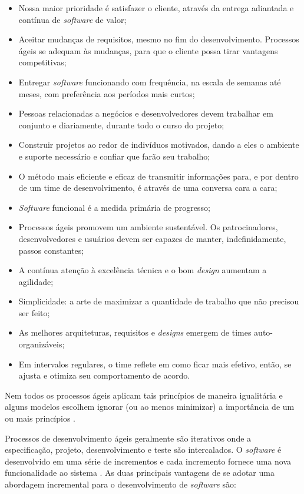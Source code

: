 \begin{itemize}
    \item Nossa maior prioridade é satisfazer o cliente, através da entrega adiantada e contínua de \textit{software} de valor;
    \item Aceitar mudanças de requisitos, mesmo no fim do desenvolvimento. Processos ágeis se adequam às mudanças, para que o cliente possa tirar vantagens competitivas;
    \item Entregar \textit{software} funcionando com frequência, na escala de semanas até meses, com preferência aos períodos mais curtos;
    \item Pessoas relacionadas a negócios e desenvolvedores devem trabalhar em conjunto e diariamente, durante todo o curso do projeto;
    \item Construir projetos ao redor de indivíduos motivados, dando a eles o ambiente e suporte necessário e confiar que farão seu trabalho;
    \item O método mais eficiente e eficaz de transmitir informações para, e por dentro de um time de desenvolvimento, é através de uma conversa cara a cara;
    \item \textit{Software} funcional é a medida primária de progresso;
    \item Processos ágeis promovem um ambiente sustentável. Os patrocinadores, desenvolvedores e usuários devem ser capazes de manter, indefinidamente, passos constantes;
    \item A contínua atenção à excelência técnica e o bom \textit{design} aumentam a agilidade;
    \item Simplicidade: a arte de maximizar a quantidade de trabalho que não precisou ser feito;
    \item As melhores arquiteturas, requisitos e \textit{designs} emergem de times auto-organizáveis;
    \item Em intervalos regulares, o time reflete em como ficar mais efetivo, então, se ajusta e otimiza seu comportamento de acordo.
\end{itemize}

Nem todos os processos ágeis aplicam tais princípios de maneira igualitária e alguns modelos escolhem ignorar (ou ao menos minimizar) a importância de um ou mais princípios \cite{pressman_2009}.

Processos de desenvolvimento ágeis geralmente são iterativos onde a
especificação, projeto, desenvolvimento e teste são intercalados. O \textit{software} é desenvolvido
em uma série de incrementos e cada incremento fornece uma nova funcionalidade ao sistema \cite{sommerville_2006}. As duas principais
vantagens de se adotar uma abordagem incremental para o desenvolvimento de \textit{software} são:

